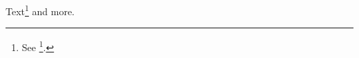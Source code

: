 \documentclass{article}
\begin{document}
Text\footnote{See \footcite{just22}.} and more.
\printbibliography
\end{document}
